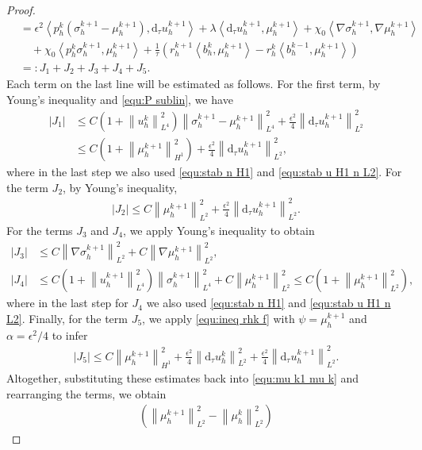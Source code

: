 \documentclass[11pt, reqno]{amsart}
\theoremstyle{definition}
\numberwithin{equation}{section}
\newcommand{\dtt}{\mathrm{d}_\tau}
\newcommand{\norm}[2]{\left\|{#1}\right\|_{#2}}
\newcommand{\inpro}[2]{\left\langle#1,#2\right\rangle}
\newcommand{\abs}[1]{\left|{#1}\right|}
\begin{document}
\begin{proof}
\begin{align}
	&=
	\epsilon^2 \inpro{p_h^k (\sigma_h^{k+1}-\mu_h^{k+1})}{\dtt u_h^{k+1}}
	+
	\lambda \inpro{\dtt u_h^{k+1}}{\mu_h^{k+1}}
	+
	\chi_0 \inpro{\nabla \sigma_h^{k+1}}{\nabla \mu_h^{k+1}}
	\nonumber\\
	&\quad
	+
	\chi_0 \inpro{p_h^k \sigma_h^{k+1}}{\mu_h^{k+1}}
	+
	\frac{1}{\tau} \left(r_h^{k+1} \inpro{b_h^k}{\mu_h^{k+1}}
	-
	r_h^k \inpro{b_h^{k-1}}{\mu_h^{k+1}}\right)
	\nonumber\\
	&=:J_1+J_2+J_3+J_4+J_5.
\end{align}
Each term on the last line will be estimated as follows. For the first term, by Young's inequality and \eqref{equ:P sublin}, we have
\begin{align*}
	\abs{J_1}
	&\leq
	C\left(1+\norm{u_h^k}{L^4}^2 \right) \norm{\sigma_h^{k+1}-\mu_h^{k+1}}{L^4}^2
	+
	\frac{\epsilon^2}{4} \norm{\dtt u_h^{k+1}}{L^2}^2
	\\
	&\leq
	C\left(1+\norm{\mu_h^{k+1}}{H^1}^2\right) + \frac{\epsilon^2}{4} \norm{\dtt u_h^{k+1}}{L^2}^2,
\end{align*}
where in the last step we also used \eqref{equ:stab n H1} and \eqref{equ:stab u H1 n L2}. For the term $J_2$, by Young's inequality,
\begin{align*}
	\abs{J_2} \leq C\norm{\mu_h^{k+1}}{L^2}^2 +\frac{\epsilon^2}{4} \norm{\dtt u_h^{k+1}}{L^2}^2. 
\end{align*}
For the terms $J_3$ and $J_4$, we apply Young's inequality to obtain
\begin{align*}
	\abs{J_3}
	&\leq
	C\norm{\nabla \sigma_h^{k+1}}{L^2}^2
	+
	C\norm{\nabla \mu_h^{k+1}}{L^2}^2,
	\\
	\abs{J_4}
	&\leq
	C \left(1+\norm{u_h^{k+1}}{L^4}^2\right) \norm{\sigma_h^{k+1}}{L^4}^2
	+
	C\norm{\mu_h^{k+1}}{L^2}^2
	\leq
	C\left(1+ \norm{\mu_h^{k+1}}{L^2}^2 \right),
\end{align*}
where in the last step for $J_4$ we also used \eqref{equ:stab n H1} and \eqref{equ:stab u H1 n L2}. Finally, for the term $J_5$, we apply \eqref{equ:ineq rhk f} with $\psi=\mu_h^{k+1}$ and $\alpha=\epsilon^2/4$ to infer
\begin{align*}
	\abs{J_5}
	\leq
	C\norm{\mu_h^{k+1}}{H^1}^2 + \frac{\epsilon^2}{4} \norm{\dtt u_h^k}{L^2}^2 + \frac{\epsilon^2}{4} \norm{\dtt u_h^{k+1}}{L^2}^2.
\end{align*}
Altogether, substituting these estimates back into \eqref{equ:mu k1 mu k} and rearranging the terms, we obtain
\begin{align*}
	\left(\norm{\mu_h^{k+1}}{L^2}^2 - \norm{\mu_h^k}{L^2}^2\right) 

\end{align*}
\end{proof}
\end{document}
